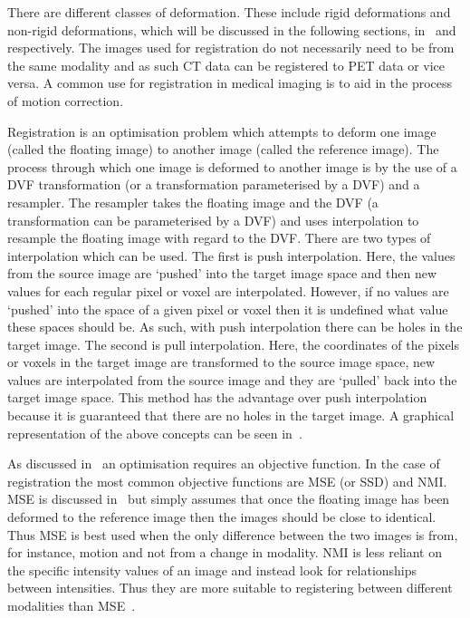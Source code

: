             There are different classes of deformation. These include rigid deformations and non-rigid deformations, which will be discussed in the following sections, in~ and~ respectively. %
            The images used for registration do not necessarily need to be from the same modality and as such \gls{CT} data can be registered to \gls{PET} data or vice versa. A common use for registration in medical imaging is to aid in the process of motion correction.
            
            Registration is an optimisation problem which attempts to deform one image (called the floating image) to another image (called the reference image). The process through which one image is deformed to another image is by the use of a \gls{DVF} transformation (or a transformation parameterised by a \gls{DVF}) and a resampler. The resampler takes the floating image and the \gls{DVF} (a transformation can be parameterised by a \gls{DVF}) and uses interpolation to resample the floating image with regard to the \gls{DVF}. There are two types of interpolation which can be used. The first is push interpolation. Here, the values from the source image are `pushed' into the target image space and then new values for each regular pixel or voxel are interpolated. However, if no values are `pushed' into the space of a given pixel or voxel then it is undefined what value these spaces should be. As such, with push interpolation there can be holes in the target image. The second is pull interpolation. Here, the coordinates of the pixels or voxels in the target image are transformed to the source image space, new values are interpolated from the source image and they are `pulled' back into the target image space. This method has the advantage over push interpolation because it is guaranteed that there are no holes in the target image. A graphical representation of the above concepts can be seen in~.
            
            As discussed in~ an optimisation requires an objective function. In the case of registration the most common objective functions are \gls{MSE} (or \gls{SSD}) and \gls{NMI}. \gls{MSE} is discussed in~ but simply assumes that once the floating image has been deformed to the reference image then the images should be close to identical. Thus \gls{MSE} is best used when the only difference between the two images is from, for instance, motion and not from a change in modality. \gls{NMI} is less reliant on the specific intensity values of an image and instead look for relationships between intensities. Thus they are more suitable to registering between different modalities than \gls{MSE}~\parencite{Hill2001, Oliveira2014}.
            
